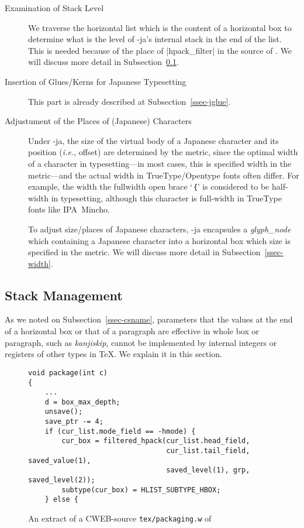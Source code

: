 \documentclass{ajt}
\begin{document}
\begin{description}
\item[Examination of Stack Level] We traverse the horizontal list which
	   is the content of a horizontal box
to determine what is the level of \LuaTeX-ja's internal stack in the end
	   of the list. This is needed because of the place of
	   |hpack_filter| in the source of \LuaTeX. We will discuss more
	   detail in Subsection~\ref{ssec-stack}.

\item[Insertion of Glues/Kerns for Japanese Typesetting]
This part is already described at Subsection~\ref{ssec-jglue}. 

\item[Adjustument of the Places of (Japanese) Characters]
Under \LuaTeX-ja, the size of the virtual body of a Japanese character
	   and its position (\emph{i.e.}, offset) are determined by the
	   metric, since the optimal width of a character in
	   typesetting---in most cases, this is specified width in the
	   metric---and the actual width in TrueType/Opentype fonts
	   often differ. For example, the width the fullwidth open brace
	   `\inhibitglue ｛' is considered to be half-width in
	   typesetting, although this character is full-width in
	   TrueType fonts like IPA~Mincho.

To adjust size/places of Japanese characters, \LuaTeX-ja encapsules a
	   \textit{glyph\_node} which containing a Japanese character
	   into a horizontal box which size is specified in the metric.
We will discuss more detail in Subsection~\ref{ssec-width}.
\end{description}

\subsection{Stack Management}
\label{ssec-stack}

As we noted on Subsection~\ref{ssec-csname}, parameters that the values
at the end of a horizontal box or that of a paragraph are effective in
whole box or paragraph, such as \emph{kanjiskip}, cannot be implemented by internal integers or
registers of other types in \TeX. We explain it in this section.

\begin{figure}
\begin{lstlisting}
void package(int c)
{
    ...
    d = box_max_depth;
    unsave();
    save_ptr -= 4;
    if (cur_list.mode_field == -hmode) {
        cur_box = filtered_hpack(cur_list.head_field,
                                 cur_list.tail_field, saved_value(1),
                                 saved_level(1), grp, saved_level(2));
        subtype(cur_box) = HLIST_SUBTYPE_HBOX;
    } else {
\end{lstlisting}
\caption{An extract of a CWEB-source \texttt{tex/packaging.w} of \LuaTeX}
\label{fig-ltsrc}
\end{figure}
\end{document}
